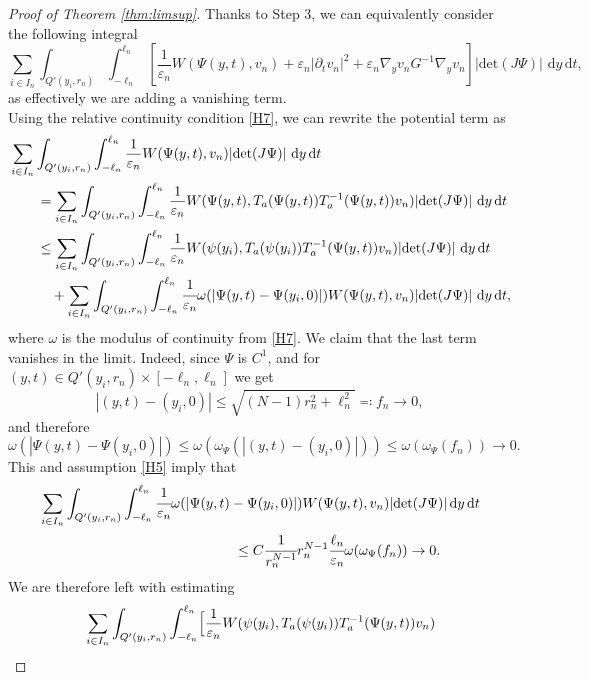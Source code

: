 \documentclass[a4paper, 11pt, reqno]{amsart}
\theoremstyle{plain}
\theoremstyle{definition}
\theoremstyle{remark}
\newcommand{\dd}{\,\mathrm{d}}
\begin{document}
\begin{proof}[Proof of Theorem \ref{thm:limsup}]
Thanks to Step 3, we can equivalently consider the following integral
$$ \sum_{i \in I_n} \int_{Q'(y_i,r_n)} \int_{-\ell_n}^{\ell_n} \left[ \frac{1}{\varepsilon_n} W(\Psi(y,t), v_n) + \varepsilon_n | \partial_t v_n|^2 + \varepsilon_n \nabla_y v_n G^{-1} \nabla_y v_n \right]| \mathrm{det}(J\Psi)|\, \dd y \dd t, $$
as effectively we are adding a vanishing term.\\
Using the relative continuity condition \ref{H7}, we can rewrite the potential term as
\begin{align*}
    &\sum_{i \in I_n} \int_{Q'(y_i,r_n)} \int_{-\ell_n}^{\ell_n} \frac{1}{\varepsilon_n} W(\Psi(y,t), v_n)| \mathrm{det}(J\Psi)|\, \dd y \dd t \\
    &\qquad= \sum_{i \in I_n} \int_{Q'(y_i,r_n)} \int_{-\ell_n}^{\ell_n} \frac{1}{\varepsilon_n} W(\Psi(y,t), T_a ( \Psi(y,t) ) T_a^{-1}(\Psi(y,t))v_n)| \mathrm{det}(J\Psi)|\, \dd y \dd t \\
    &\qquad\leq \sum_{i \in I_n} \int_{Q'(y_i,r_n)} \int_{-\ell_n}^{\ell_n} \frac{1}{\varepsilon_n} W(\psi(y_i), T_a(\psi(y_i)) T_a^{-1}(\Psi(y,t))v_n) | \mathrm{det}(J\Psi)|\, \dd y \dd t \\
    &\qquad\quad+ \sum_{i \in I_n} \int_{Q'(y_i,r_n)} \int_{-\ell_n}^{\ell_n} \cfrac{1}{\varepsilon_n} \omega (|\Psi(y,t) - \Psi(y_i,0)|) W(\Psi(y,t),v_n) | \mathrm{det}(J\Psi)|\, \dd y \dd t,
\end{align*}
where $\omega$ is the modulus of continuity from \ref{H7}.
We claim that the last term vanishes in the limit. Indeed, since $\Psi$ is $C^1$, and for $(y,t) \in Q'(y_i,r_n) \times [-\ell_n, \ell_n]$ we get 
$$ |(y,t)-(y_i,0)| \leq \sqrt{(N-1)r_n^2 + \ell_n^2} \eqqcolon f_n \to 0, $$
and therefore
$$ \omega (|\Psi(y,t) - \Psi(y_i,0)|) \leq \omega( \omega_\Psi (|(y,t) - (y_i,0)|)) \leq \omega ( \omega_\Psi (f_n)) \to 0. $$
This and assumption \ref{H5} imply that
\begin{align*}
    &\sum_{i \in I_n} \int_{Q'(y_i,r_n)} \int_{-\ell_n}^{\ell_n} \cfrac{1}{\varepsilon_n} \omega (|\Psi(y,t) - \Psi(y_i,0)|) W(\Psi(y,t),v_n)| \mathrm{det}(J\Psi)| \dd y \dd t \\
    &\qquad \qquad \qquad \qquad \qquad \qquad \qquad\leq C \cfrac{1}{r_n^{N-1}} r_n^{N-1} \cfrac{\ell_n}{\varepsilon_n} \omega( \omega_\Psi(f_n) ) \to 0.
\end{align*}
We are therefore left with estimating
\begin{align}
    &\sum_{i \in I_n} \int_{Q'(y_i,r_n)} \int_{-\ell_n}^{\ell_n} \Bigl[ \frac{1}{\varepsilon_n} W(\psi(y_i), T_a(\psi(y_i)) T_a^{-1}(\Psi(y,t))v_n) \nonumber \\

\end{align}
\end{proof}
\end{document}
